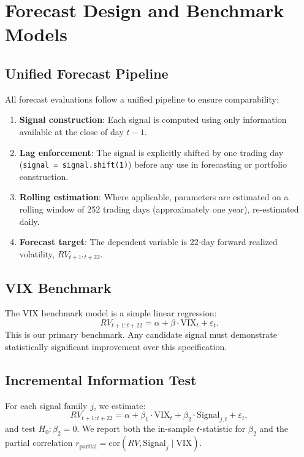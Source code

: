 \documentclass[12pt,a4paper]{article}
\begin{document}
\section{Forecast Design and Benchmark Models}
\label{sec:methodology}

\subsection{Unified Forecast Pipeline}

All forecast evaluations follow a unified pipeline to ensure comparability:

\begin{enumerate}
    \item \textbf{Signal construction}: Each signal is computed using only information available at the close of day $t-1$.
    \item \textbf{Lag enforcement}: The signal is explicitly shifted by one trading day (\texttt{signal = signal.shift(1)}) before any use in forecasting or portfolio construction.
    \item \textbf{Rolling estimation}: Where applicable, parameters are estimated on a rolling window of 252 trading days (approximately one year), re-estimated daily.
    \item \textbf{Forecast target}: The dependent variable is 22-day forward realized volatility, $RV_{t+1:t+22}$.
\end{enumerate}

\subsection{VIX Benchmark}

The VIX benchmark model is a simple linear regression:
\begin{equation}
RV_{t+1:t+22} = \alpha + \beta \cdot \text{VIX}_t + \varepsilon_t.
\label{eq:vix_benchmark}
\end{equation}
This is our primary benchmark. Any candidate signal must demonstrate statistically significant improvement over this specification.

\subsection{Incremental Information Test}

For each signal family $j$, we estimate:
\begin{equation}
RV_{t+1:t+22} = \alpha + \beta_1 \cdot \text{VIX}_t + \beta_2 \cdot \text{Signal}_{j,t} + \varepsilon_t,
\label{eq:incremental}
\end{equation}
and test $H_0: \beta_2 = 0$. We report both the in-sample $t$-statistic for $\beta_2$ and the partial correlation $r_{\text{partial}} = \text{cor}(RV, \text{Signal}_j \mid \text{VIX})$.
\end{document}
